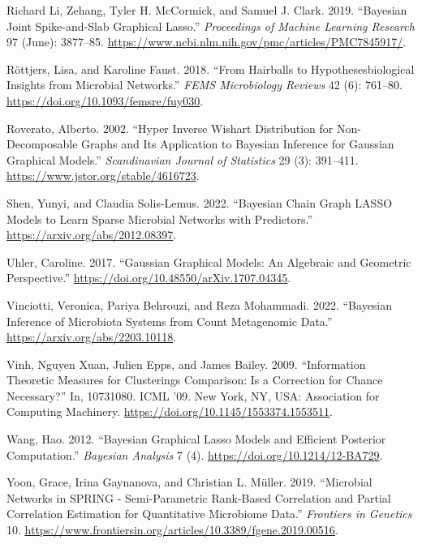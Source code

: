 \documentclass[
  a4paper,
]{article}
\newlength{\cslhangindent}
\newlength{\cslentryspacingunit} %
\newenvironment{CSLReferences}[2] %
 {%
  \setlength{\parindent}{0pt}
  \ifodd #1
  \let\oldpar\par
  \def\par{\hangindent=\cslhangindent\oldpar}
  \fi
  \setlength{\parskip}{#2\cslentryspacingunit}
 }%
 {}
\begin{document}
\begin{CSLReferences}{1}{0}
\leavevmode{}%
Richard Li, Zehang, Tyler H. McCormick, and Samuel J. Clark. 2019.
{``Bayesian Joint Spike-and-Slab Graphical Lasso.''} \emph{Proceedings
of Machine Learning Research} 97 (June): 3877--85.
\url{https://www.ncbi.nlm.nih.gov/pmc/articles/PMC7845917/}.

\leavevmode{}%
Röttjers, Lisa, and Karoline Faust. 2018. {``From Hairballs to
Hypotheses{\textendash}biological Insights from Microbial Networks.''}
\emph{FEMS Microbiology Reviews} 42 (6): 761--80.
\url{https://doi.org/10.1093/femsre/fuy030}.

\leavevmode{}%
Roverato, Alberto. 2002. {``Hyper Inverse Wishart Distribution for
Non-Decomposable Graphs and Its Application to Bayesian Inference for
Gaussian Graphical Models.''} \emph{Scandinavian Journal of Statistics}
29 (3): 391--411. \url{https://www.jstor.org/stable/4616723}.

\leavevmode{}%
Shen, Yunyi, and Claudia Solis-Lemus. 2022. {``Bayesian Chain Graph
LASSO Models to Learn Sparse Microbial Networks with Predictors.''}
\url{https://arxiv.org/abs/2012.08397}.

\leavevmode{}%
Uhler, Caroline. 2017. {``Gaussian Graphical Models: An Algebraic and
Geometric Perspective.''}
\url{https://doi.org/10.48550/arXiv.1707.04345}.

\leavevmode{}%
Vinciotti, Veronica, Pariya Behrouzi, and Reza Mohammadi. 2022.
{``Bayesian Inference of Microbiota Systems from Count Metagenomic
Data.''} \url{https://arxiv.org/abs/2203.10118}.

\leavevmode{}%
Vinh, Nguyen Xuan, Julien Epps, and James Bailey. 2009. {``Information
Theoretic Measures for Clusterings Comparison: Is a Correction for
Chance Necessary?''} In, 10731080. ICML '09. New York, NY, USA:
Association for Computing Machinery.
\url{https://doi.org/10.1145/1553374.1553511}.

\leavevmode{}%
Wang, Hao. 2012. {``Bayesian Graphical Lasso Models and Efficient
Posterior Computation.''} \emph{Bayesian Analysis} 7 (4).
\url{https://doi.org/10.1214/12-BA729}.

\leavevmode{}%
Yoon, Grace, Irina Gaynanova, and Christian L. Müller. 2019.
{``Microbial Networks in SPRING - Semi-Parametric Rank-Based Correlation
and Partial Correlation Estimation for Quantitative Microbiome Data.''}
\emph{Frontiers in Genetics} 10.
\url{https://www.frontiersin.org/articles/10.3389/fgene.2019.00516}.


\end{CSLReferences}
\end{document}
